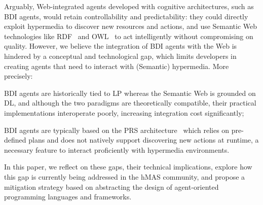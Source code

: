 \documentclass[
]{ceurart}
\begin{document}
Arguably,
Web-integrated agents developed with cognitive architectures,
such as \ac{BDI} agents,
would retain controllability and predictability:
they could directly exploit hypermedia to discover new resources and actions,
and use Semantic Web technologies like \ac{RDF}~\cite{RDF_Concepts_W3C:14} and \ac{OWL}~\cite{OWL_Syntax_W3C:12}
to act intelligently without compromising on quality.
%
However,
we believe
the integration of \ac{BDI} agents with the Web
is hindered by a conceptual and technological gap,
which limits developers in creating agents that need to interact with (Semantic) hypermedia.
%
More precisely:
\begin{enumerate*}[label=\textbf{(G\arabic*)}]
  \item\label{gap:logic}
  \ac{BDI} agents are historically tied to \ac{LP}
  whereas the Semantic Web is grounded on \ac{DL},
  and although the two paradigms are theoretically compatible,
  their practical implementations interoperate poorly,
  increasing integration cost significantly;

  \item\label{gap:open-world}
  \ac{BDI} agents are typically based on the \ac{PRS} architecture~\cite{georgeff1986pieee}
  which relies on pre-defined plans and does not natively support discovering new actions at runtime,
  a necessary feature to interact proficiently with hypermedia environments.
\end{enumerate*}

In this paper,
we reflect on these gaps,
their technical implications, %
explore how this gap is currently being addressed in the \ac{hMAS} community,
and
propose a mitigation strategy based on abstracting the design of agent-oriented programming languages and frameworks.
\end{document}
